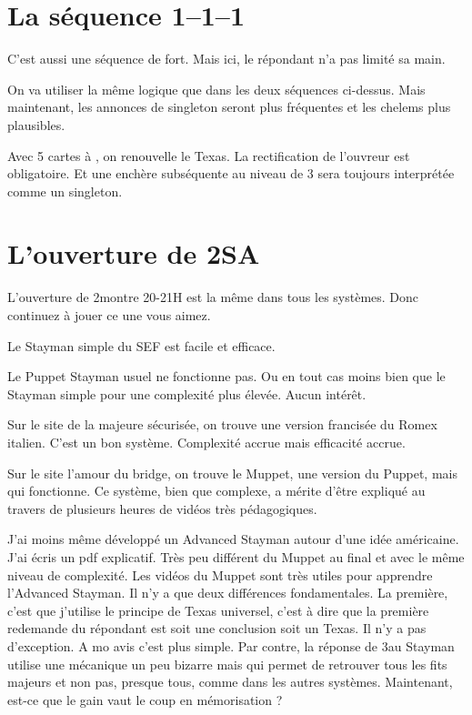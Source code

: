 \documentclass[a4paper,12pt, french]{article}
\newcommand{\T}{\Cl}
\newcommand{\K}{\Di}
\newcommand{\C}{\He}
\renewcommand{\P}{\Sp}
\begin{document}
 
\section{La séquence 1\T--1\C--1\NT}

C'est aussi une séquence de \NT fort. Mais ici, le répondant n'a pas limité sa main. 

On va utiliser la même logique que dans les deux séquences ci-dessus. Mais maintenant, les annonces de singleton seront plus fréquentes et les chelems plus plausibles.

Avec 5 cartes à \P, on renouvelle le Texas. La rectification de l'ouvreur est obligatoire. Et une enchère subséquente au niveau de 3 sera toujours interprétée comme un singleton.

\section{L'ouverture de 2SA}

L'ouverture de 2\NT  montre 20-21H est la même dans tous les  systèmes. Donc continuez à jouer ce une vous aimez. 

Le Stayman simple du SEF est facile et efficace.

Le Puppet Stayman usuel ne fonctionne pas. Ou en tout cas moins bien que le Stayman simple pour une complexité plus élevée. Aucun intérêt.

Sur le site de la majeure sécurisée, on trouve une version francisée du Romex italien. C'est un bon système. Complexité accrue mais efficacité accrue.

Sur le site l'amour du bridge, on trouve le Muppet, une version du Puppet, mais qui fonctionne. Ce système, bien que complexe, a mérite d'être expliqué au travers de plusieurs heures de vidéos très pédagogiques.

J'ai moins même développé un Advanced Stayman autour d'une idée américaine. J'ai écris un pdf explicatif. Très peu différent du Muppet au final et avec le même niveau de complexité. Les vidéos du Muppet sont très utiles pour apprendre l'Advanced Stayman. Il n'y a que deux différences fondamentales. La première, c'est que j'utilise le principe de Texas universel, c'est à dire que la première redemande du répondant est soit une conclusion soit un Texas. Il n'y a pas d'exception. A mo avis c'est plus simple. Par contre, la réponse de 3\K au Stayman utilise une mécanique un peu bizarre mais qui permet de retrouver tous les fits majeurs et non pas, presque tous, comme dans les autres systèmes. Maintenant, est-ce que le gain vaut le coup en mémorisation ?
\end{document}

